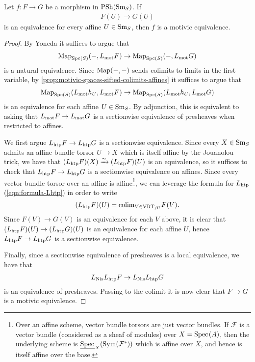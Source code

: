 \documentclass[11pt,openany]{book}
\begin{document}
\begin{proposition} \cite[3.16]{Hoyois6} Let $f \colon F \to G$ be a morphism in $\mathrm{PSh}(\mathrm{Sm}_S)$. If
\begin{align*}
    F(U) \to G(U)
\end{align*}
is an equivalence for every affine $U\in \mathrm{Sm}_S$, then $f$ is a motivic equivalence.
\end{proposition}
\begin{proof} 


By Yoneda it suffices to argue that
\begin{align*}
    \mathrm{Map}_{\mathrm{Spc}(S)} (-,L_{\mathrm{mot}} F) \to \mathrm{Map}_{\mathrm{Spc}(S)} (-,L_{\mathrm{mot}} G)
\end{align*}
is a natural equivalence. Since $\mathrm{Map}(-,-)$ sends colimits to limits in the first variable, by \autoref{prop:motivic-spaces-sifted-colimits-affines} it suffices to argue that
\begin{align*}
    \mathrm{Map}_{\mathrm{Spc}(S)}(L_{\mathrm{mot}} h_U, L_{\mathrm{mot}} F) \to \mathrm{Map}_{\mathrm{Spc}(S)}(L_{\mathrm{mot}} h_U, L_{\mathrm{mot}} G)
\end{align*}
is an equivalence for each affine $U \in \mathrm{Sm}_S$. By adjunction, this is equivalent to asking that $L_{\mathrm{mot}} F \to L_{\mathrm{mot}} G$ is a sectionwise equivalence of presheaves when restricted to affines.

We first argue $L_{\mathrm{htp}} F \to L_{\mathrm{htp}} G$ is a sectionwise equivalence. Since every $X\in \mathrm{Sm}_S$ admits an affine bundle torsor $U \to X$ which is itself affine by the Jouanolou trick, we have that $(L_{\mathrm{htp}}F)(X) \xrightarrow{\sim} (L_{\mathrm{htp}} F)(U)$ is an equivalence, so it suffices to check that $L_{\mathrm{htp}} F \to L_{\mathrm{htp}} G$ is a sectionwise equivalence on affines. Since every vector bundle torsor over an affine is affine\footnote{%
Over an affine scheme, vector bundle torsors are just vector bundles. If $\mathscr{F}$ is a vector bundle (considered as a sheaf of modules) over $X = \text{Spec}\hspace{0.1em}(A)$, then the underlying scheme is $\underline{\text{Spec}\hspace{0.1em}}_X(\mathrm{Sym}(\mathcal{F}^\ast))$ which is affine over $X$, and hence is itself affine over the base.
}, we can leverage the formula for $L_{\mathrm{htp}}$ (\autoref{eqn:formula-Lhtp}) in order to write
\begin{align*}
    (L_{\mathrm{htp}} F)(U) = \mathrm{colim}_{V\in \text{VBT}_{/U}} F(V).
\end{align*}
Since $F(V) \to G(V)$ is an equivalence for each $V$ above, it is clear that $(L_{\mathrm{htp}} F)(U) \to (L_{\mathrm{htp}} G)(U)$ is an equivalence for each affine $U$, hence $L_{\mathrm{htp}} F \to L_{\mathrm{htp}} G$ is a sectionwise equivalence.

Finally, since a sectionwise equivalence of presheaves is a local equivalence, we have that
\begin{align*}
    L_{\mathrm{Nis}} L_{\mathrm{htp}} F \to L_{\mathrm{Nis}} L_{\mathrm{htp}} G
\end{align*}
is an equivalence of presheaves. Passing to the colimit it is now clear that $F \to G$ is a motivic equivalence.
\end{proof}
\end{document}
